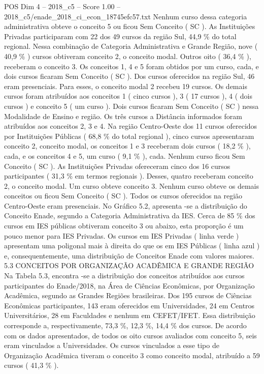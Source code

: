 \begin{textsample}{POS Dim 4 – 2018\_c5 – Score 1.00 – 2018\_c5/enade\_2018\_ci\_econ\_18745efc57.txt}
Nenhum curso dessa categoria administrativa obteve o conceito 5 ou ficou Sem Conceito ( SC ).
As Instituições Privadas participaram com 22 dos 49 cursos da região Sul, 44,9 \% do total regional.
Nessa combinação de Categoria Administrativa e Grande Região, nove ( 40,9 \% ) cursos obtiveram conceito 2, o conceito modal.
Outros oito ( 36,4 \% ), receberam o conceito 3.
Os conceitos 1, 4 e 5 foram obtidos por um curso, cada, e dois cursos ficaram Sem Conceito ( SC ).
Dos cursos oferecidos na região Sul, 46 eram presenciais.
Para esses, o conceito modal 2 recebeu 19 cursos.
Os demais cursos foram atribuídos aos conceitos 1 ( cinco cursos ), 3 ( 17 cursos ), 4 ( dois cursos ) e conceito 5 ( um curso ).
Dois cursos ficaram Sem Conceito ( SC ) nessa Modalidade de Ensino e região.
Os três cursos a Distância informados foram atribuídos aos conceitos 2, 3 e 4.
Na região Centro-Oeste dos 11 cursos oferecidos por Instituições Públicas ( 68,8 \% do total regional ), cinco cursos apresentaram conceito 2, conceito modal, os conceitos 1 e 3 receberam dois cursos ( 18,2 \% ), cada, e os conceitos 4 e 5, um curso ( 9,1 \% ), cada.
Nenhum curso ficou Sem Conceito ( SC ).
As Instituições Privadas ofereceram cinco dos 16 cursos participantes ( 31,3 \% em termos regionais ).
Desses, quatro receberam conceito 2, o conceito modal.
Um curso obteve conceito 3.
Nenhum curso obteve os demais conceitos ou ficou Sem Conceito ( SC ).
Todos os cursos oferecidos na região Centro-Oeste eram presenciais.
No Gráfico 5.2, apresenta -se a distribuição do Conceito Enade, segundo a Categoria Administrativa da IES.
Cerca de 85 \% dos cursos em IES públicas obtiveram conceito 3 ou abaixo, esta proporção é um pouco menor para IES Privadas.
Os cursos em IES Privadas ( linha verde ) apresentam uma poligonal mais à direita do que os em IES Públicas ( linha azul ) e, consequentemente, uma distribuição de Conceitos Enade com valores maiores. 5.3 CONCEITOS POR ORGANIZAÇÃO ACADÊMICA E GRANDE REGIÃO Na Tabela 5.3, encontra -se a distribuição dos conceitos atribuídos aos cursos participantes do Enade/2018, na Área de Ciências Econômicas, por Organização Acadêmica, segundo as Grandes Regiões brasileiras.
Dos 195 cursos de Ciências Econômicas participantes, 143 eram oferecidos em Universidades, 24 em Centros Universitários, 28 em Faculdades e nenhum em CEFET/IFET.
Essa distribuição corresponde a, respectivamente, 73,3 \%, 12,3 \%, 14,4 \% dos cursos.
De acordo com os dados apresentados, de todos os oito cursos avaliados com conceito 5, seis eram vinculados a Universidades.
Os cursos vinculados a esse tipo de Organização Acadêmica tiveram o conceito 3 como conceito modal, atribuído a 59 cursos ( 41,3 \% ).

\end{textsample}
